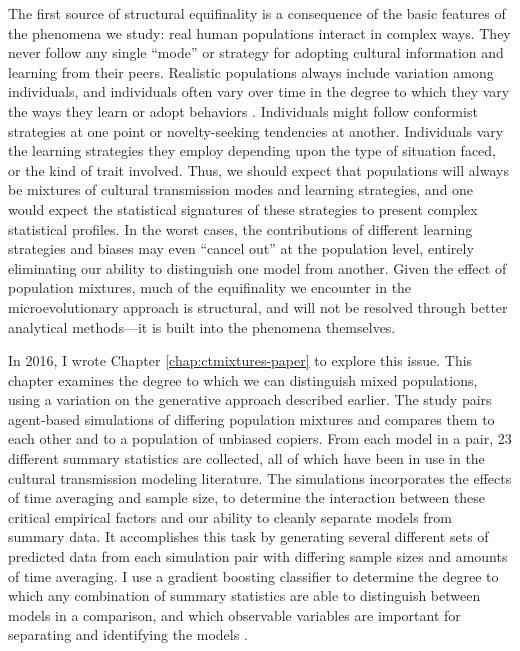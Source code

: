 The first source of structural equifinality is a consequence of the basic features of the phenomena we study: real human populations interact in complex ways. They never follow any single ``mode'' or strategy for adopting cultural information and learning from their peers. Realistic populations always include variation among individuals, and individuals often vary over time in the degree to which they vary the ways they learn or adopt behaviors . Individuals might follow conformist strategies at one point or novelty-seeking tendencies at another. Individuals vary the learning strategies they employ depending upon the type of situation faced, or the kind of trait involved. Thus, we should expect that populations will always be mixtures of cultural transmission modes and learning strategies, and one would expect the statistical signatures of these strategies to present complex statistical profiles. In the worst cases, the contributions of different learning strategies and biases may even ``cancel out'' at the population level, entirely eliminating our ability to distinguish one model from another. Given the effect of population mixtures, much of the equifinality we encounter in the microevolutionary approach is structural, and will not be resolved through better analytical methods—it is built into the phenomena themselves. 

In 2016, I wrote Chapter \ref{chap:ctmixtures-paper} to explore this issue. This chapter examines the degree to which we can distinguish mixed populations, using a variation on the generative approach described earlier. The study pairs agent-based simulations of differing population mixtures and compares them to each other and to a population of unbiased copiers. From each model in a pair, 23 different summary statistics are collected, all of which have been in use in the cultural transmission modeling literature. The simulations incorporates the effects of time averaging and sample size, to determine the interaction between these critical empirical factors and our ability to cleanly separate models from summary data. It accomplishes this task by generating several different sets of predicted data from each simulation pair with differing sample sizes and amounts of time averaging. I use a gradient boosting classifier to determine the degree to which any combination of summary statistics are able to distinguish between models in a comparison, and which observable variables are important for separating and identifying the models \citep{AlexeyNatekin2013,Friedman2000,hastie2009elements}.

